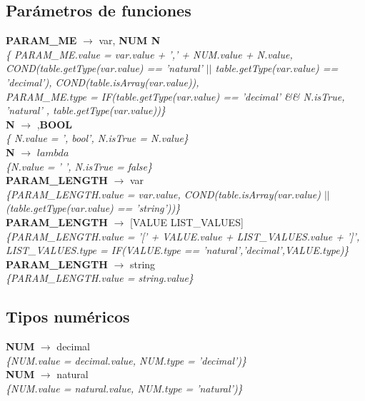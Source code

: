 \documentclass[10pt,a4paper]{article}
\begin{document}
\subsection{Parámetros de funciones}
\textbf{PARAM\_ME} $\rightarrow$ var, \textbf{NUM N} \\
\textit{\{ PARAM\_ME.value = var.value + ',' + NUM.value + N.value, COND(table.getType(var.value) == 'natural' $||$ table.getType(var.value) == 'decimal'), COND(table.isArray(var.value)),\\
PARAM\_ME.type = IF(table.getType(var.value) == 'decimal' \&\& N.isTrue,  'natural' , table.getType(var.value))\}} \\

\textbf{N} $\rightarrow$ ,\textbf{BOOL} \\
\textit{\{ N.value = ', bool', N.isTrue = N.value\}} \\ 

\textbf{N} $\rightarrow$ $lambda$  \\
\textit{\{N.value = ' ', N.isTrue = false\}} \\

\textbf{PARAM\_LENGTH} $\rightarrow$ var \\
\textit{\{PARAM\_LENGTH.value = var.value, COND(table.isArray(var.value) $||$ (table.getType(var.value) == 'string'))\}} \\

\textbf{PARAM\_LENGTH} $\rightarrow$ [VALUE LIST\_VALUES]\\
\textit{\{PARAM\_LENGTH.value = '[' + VALUE.value + LIST\_VALUES.value + ']', LIST\_VALUES.type = IF(VALUE.type == 'natural','decimal',VALUE.type)\}} \\

\textbf{PARAM\_LENGTH} $\rightarrow$ string \\
\textit{\{PARAM\_LENGTH.value = string.value\}} \\

\subsection{Tipos numéricos}
\textbf{NUM} $\rightarrow$ decimal \\
\textit{\{NUM.value = decimal.value, NUM.type = 'decimal')\}}  \\ 

\textbf{NUM} $\rightarrow$ natural \\
\textit{\{NUM.value = natural.value, NUM.type = 'natural')\}}  \\ 
\end{document}
